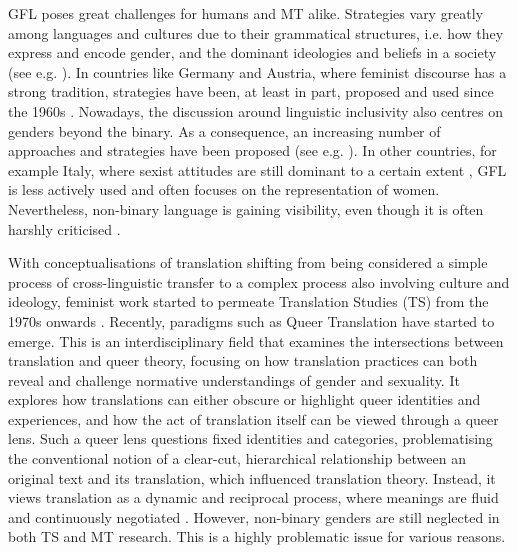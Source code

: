 GFL poses great challenges for humans and MT alike. Strategies vary greatly among languages and cultures due to their grammatical structures, i.e. how they express and encode gender, and the dominant ideologies and beliefs in a society (see e.g. \cite{lardellitranslating}). In countries like Germany and Austria, where feminist discourse has a strong tradition,  strategies have been, at least in part, proposed and used since the 1960s \citep{sczesny2016can}. Nowadays, the discussion around linguistic inclusivity also centres on genders beyond the binary. As a consequence, an increasing number of approaches and strategies have been proposed (see e.g. \cite{hornscheidt2021wie}). In other countries, for example Italy, where sexist attitudes are still dominant to a certain extent \citep{murgia2021stai}, GFL is less actively used and often focuses on the representation of women. Nevertheless, non-binary language is gaining visibility, even though it is often harshly criticised \citep{cosinonschwa}. 

With conceptualisations of translation shifting from being considered a simple process of cross-linguistic transfer to a complex process also involving culture and ideology, feminist work started to permeate Translation Studies (TS) from the 1970s onwards \citep{von2016translation}. Recently, paradigms such as Queer Translation \citep{baer2017introduction} have started to emerge. This is an interdisciplinary field that examines the intersections between translation and queer theory, focusing on how translation practices can both reveal and challenge normative understandings of gender and sexuality. It explores how translations can either obscure or highlight queer identities and experiences, and how the act of translation itself can be viewed through a queer lens. Such a queer lens questions fixed identities and categories, problematising the conventional notion of a clear-cut, hierarchical relationship between an original text and its translation, which influenced translation theory. Instead, it views translation as a dynamic and reciprocal process, where meanings are fluid and continuously negotiated \citep{spurlin2014queering,baer2017introduction}. However, non-binary genders are still neglected in both TS and MT research. This is a highly problematic issue for various reasons.

